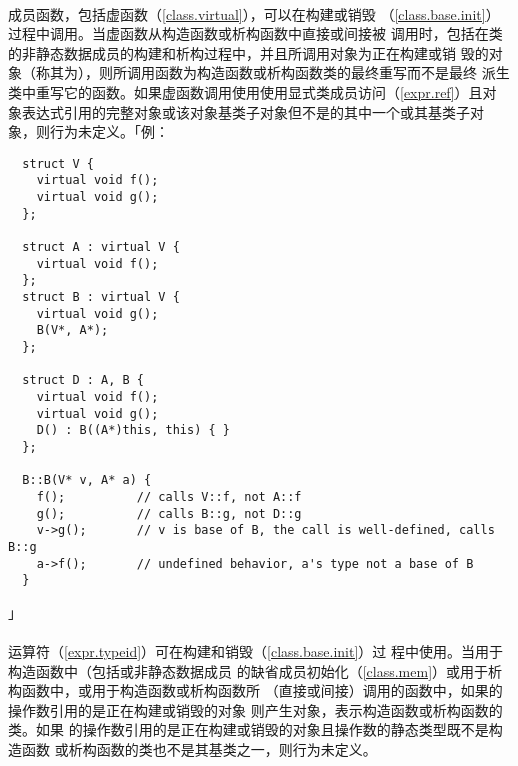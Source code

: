 \paragraph{}
成员函数，包括虚函数（\ref{class.virtual}），可以在构建或销毁
（\ref{class.base.init}）过程中调用。当虚函数从构造函数或析构函数中直接或间接被
调用时，包括在类的非静态数据成员的构建和析构过程中，并且所调用对象为正在构建或销
毁的对象（称其为），则所调用函数为构造函数或析构函数类的最终重写而不是最终
派生类中重写它的函数。如果虚函数调用使用使用显式类成员访问（\ref{expr.ref}）且对
象表达式引用的完整对象或该对象基类子对象但不是的其中一个或其基类子对
象，则行为未定义。「例：
\begin{lstlisting}
  struct V {
    virtual void f();
    virtual void g();
  };

  struct A : virtual V {
    virtual void f();
  };
  struct B : virtual V {
    virtual void g();
    B(V*, A*);
  };

  struct D : A, B {
    virtual void f();
    virtual void g();
    D() : B((A*)this, this) { }
  };

  B::B(V* v, A* a) {
    f();          // calls V::f, not A::f
    g();          // calls B::g, not D::g
    v->g();       // v is base of B, the call is well-defined, calls B::g
    a->f();       // undefined behavior, a's type not a base of B
  }
\end{lstlisting}」

\paragraph{}
运算符（\ref{expr.typeid}）可在构建和销毁（\ref{class.base.init}）过
程中使用。当用于构造函数中（包括或非静态数据成员
的缺省成员初始化（\ref{class.mem}）或用于析构函数中，或用于构造函数或析构函数所
（直接或间接）调用的函数中，如果的操作数引用的是正在构建或销毁的对象
则产生对象，表示构造函数或析构函数的类。如果
的操作数引用的是正在构建或销毁的对象且操作数的静态类型既不是构造函数
或析构函数的类也不是其基类之一，则行为未定义。

